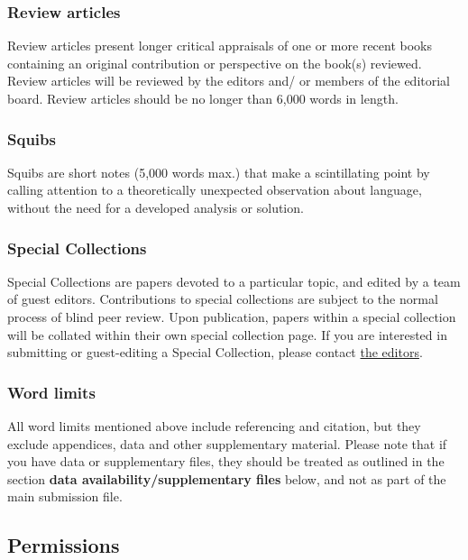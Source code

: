 \documentclass[charis,linguex]{glossa}
\begin{document}
\subsubsection{Review articles}

Review articles present longer critical appraisals of one or more recent books containing an original contribution or perspective on the book(s) reviewed. Review articles will be reviewed by the editors and/ or members of the editorial board. Review articles should be no longer than 6,000 words in length.

\subsubsection{Squibs}

Squibs are short notes (5,000 words max.) that make a scintillating point by calling attention to a theoretically unexpected observation about language, without the need for a developed analysis or solution.

\subsubsection{Special Collections}

Special Collections are papers devoted to a particular topic, and edited by a team of guest editors. Contributions to special collections are subject to the normal process of blind peer review. Upon publication, papers within a special collection will be collated within their own special collection page. If you are interested in submitting or guest-editing a Special Collection, please contact \href{https://www.glossa-journal.org/about/editorialteam/}{the editors}.

\subsubsection{Word limits}

All word limits mentioned above include referencing and citation, but they exclude appendices, data and other supplementary material. Please note that if you have data or supplementary files, they should be treated as outlined in the section \textbf{data availability/supplementary files} below, and not as part of the main submission file.


\subsection{Permissions}
\end{document}
